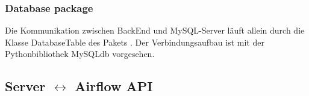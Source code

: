 \subsubsection{Database package}
Die Kommunikation zwischen BackEnd und MySQL-Server läuft allein durch die Klasse DatabaseTable des Pakets . 
Der Verbindungsaufbau ist mit der Pythonbibliothek MySQLdb vorgesehen.


\subsection{Server $\leftrightarrow$ Airflow API}

\newpage